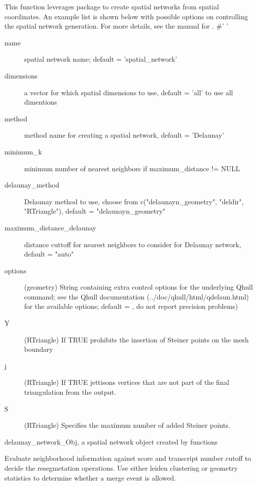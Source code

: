 \documentclass[letterpaper]{book}
\begin{document}
\begin{Details}
This function leverages  package to create spatial networks from spatial coordinates. An example  list is shown below with possible options on controlling the spatial network generation. For more details, see the manual for .
\#' ' \begin{description}

\item[name] spatial network name; default = 'spatial\_network'
\item[dimensions] a vector for which spatial dimensions to use, default = 'all' to use all dimentions
\item[method] method name for creating a spatial network, default = 'Delaunay'
\item[minimum\_k] minimum number of nearest neighbors if maximum\_distance != NULL
\item[delaunay\_method] Delaunay method to use, choose from c("delaunayn\_geometry", "deldir", "RTriangle"), default = "delaunayn\_geometry"
\item[maximum\_distance\_delaunay] distance cuttoff for nearest neighbors to consider for Delaunay network, default = "auto"
\item[options] (geometry) String containing extra control options for the underlying Qhull command; see the Qhull documentation (../doc/qhull/html/qdelaun.html) for the available options; default = , do not report precision problems)
\item[Y] (RTriangle) If TRUE prohibits the insertion of Steiner points on the mesh boundary
\item[j] (RTriangle) If TRUE jettisons vertices that are not part of the final triangulation from the output.
\item[S] (RTriangle) Specifies the maximum number of added Steiner points.

\end{description}

\end{Details}
%
\begin{Value}
delaunay\_network\_Obj, a spatial network object created by  functions
\end{Value}
%
\begin{Description}
Evaluate neighborhood information against score and transcript number cutoff to decide the resegmetation operations. Use either leiden clustering or geometry statistics to determine whether a merge event is allowed.
\end{Description}
\end{document}
